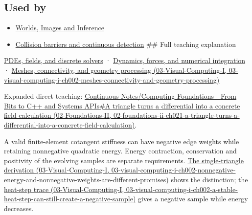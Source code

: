 \subsection{Used by}\label{appendix-1988d465c119-used-by}

\begin{itemize}
\item
  \href{Continuous\%20Notes/University\%20-\%20Worlds,\%20Images\%20and\%20Inference\%20-\%20Graphics,\%20Vision\%20and\%20Photography}{Worlds, Images and Inference}
\item
  \hyperref[appendix-a9ba01fa72a6]{Collision barriers and continuous detection} \#\# Full teaching explanation
\end{itemize}

\hyperref[04-visual-computing-ii-ch030-pdes-fields-and-discrete-solvers]{PDEs, fields, and discrete solvers} · \hyperref[04-visual-computing-ii-ch029-dynamics-forces-and-numerical-integration]{Dynamics, forces, and numerical integration} · \href{../03-Visual-Computing-I/main.pdf\#nameddest=03-visual-computing-i-ch002-meshes-connectivity-and-geometry-processing}{Meshes, connectivity, and geometry processing (03-Visual-Computing-I, 03-visual-computing-i-ch002-meshes-connectivity-and-geometry-processing)}

Expanded direct teaching: \href{../02-Foundations-II/main.pdf\#nameddest=02-foundations-ii-ch021-a-triangle-turns-a-differential-into-a-concrete-field-calculation}{Continuous Notes/Computing Foundations - From Bits to C++ and Systems APIs\#A triangle turns a differential into a concrete field calculation (02-Foundations-II, 02-foundations-ii-ch021-a-triangle-turns-a-differential-into-a-concrete-field-calculation)}.

A valid finite-element cotangent stiffness can have negative edge weights while retaining nonnegative quadratic energy. Energy contraction, conservation and positivity of the evolving samples are separate requirements. \href{../03-Visual-Computing-I/main.pdf\#nameddest=03-visual-computing-i-ch002-nonnegative-energy-and-nonnegative-weights-are-different-promises}{The single-triangle derivation (03-Visual-Computing-I, 03-visual-computing-i-ch002-nonnegative-energy-and-nonnegative-weights-are-different-promises)} shows the distinction; \href{../03-Visual-Computing-I/main.pdf\#nameddest=03-visual-computing-i-ch002-a-stable-heat-step-can-still-create-a-negative-sample}{the heat-step trace (03-Visual-Computing-I, 03-visual-computing-i-ch002-a-stable-heat-step-can-still-create-a-negative-sample)} gives a negative sample while energy decreases.
